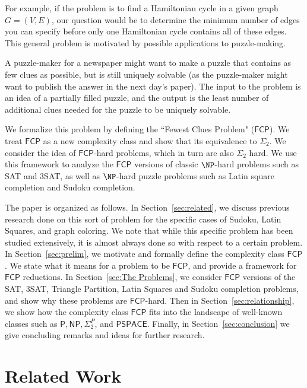 \documentclass[runningheads,a4paper]{llncs}
\begin{document}
For example, if the problem is to find a Hamiltonian cycle in a given graph $G = (V,E)$, our question would be to determine the minimum number of edges you can specify before only one Hamiltonian cycle contains all of these edges. This general problem is motivated by possible applications to puzzle-making. 

A puzzle-maker for a newspaper might want to make a puzzle that contains as few clues as possible, but is still uniquely solvable (as the puzzle-maker might want to publish the answer in the next day's paper). The input to the problem is an idea of a partially filled puzzle, and the output is the least number of additional clues needed for the puzzle to be uniquely solvable.

We formalize this problem by defining the ``Fewest Clues Problem" ($\mathsf{FCP}$). We treat $\mathsf{FCP}$ as a new complexity class and show that its equivalence to $\Sigma_2$. We consider the idea of $\mathsf{FCP}$-hard problems, which in turn are also $\Sigma_2$ hard. We use this framework to analyze the $\mathsf{FCP}$ versions of classic $\NP$-hard problems such as SAT and 3SAT, as well as $\NP$-hard puzzle problems such as Latin square completion and Sudoku completion. 

The paper is organized as follows. In Section~\ref{sec:related}, we discuss previous research done on this sort of problem for the specific cases of Sudoku, Latin Squares, and graph coloring. We note that while this specific problem has been studied extensively, it is almost always done so with respect to a certain problem. In Section~\ref{sec:prelim}, we motivate and formally define the complexity class $\mathsf{FCP}$. We state what it means for a problem to be $\mathsf{FCP}$, and provide a framework for $\mathsf{FCP}$ reductions. In Section~\ref{sec:The Problems}, we consider $\mathsf{FCP}$ versions of the SAT, 3SAT, Triangle Partition, Latin Squares and Sudoku completion problems, and show why these problems are $\mathsf{FCP}$-hard. Then in Section~\ref{sec:relationship}, we show how the complexity class $\mathsf{FCP}$ fits into the landscape of well-known classes such as $\mathsf{P}, \mathsf{NP}, \Sigma_2^P$, and $\mathsf{PSPACE}$. Finally, in Section~\ref{sec:conclusion} we give concluding remarks and ideas for further research.

\section{Related Work}
\label{sec:relatedwork}
\end{document}
